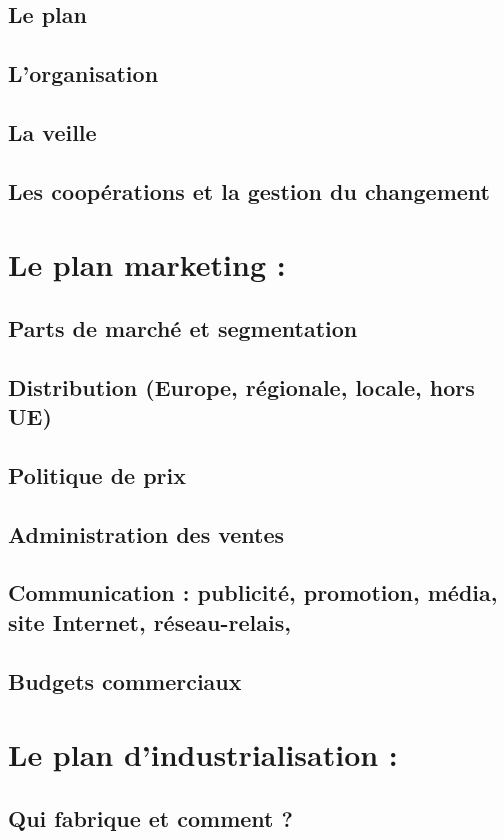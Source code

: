 	\subsection{Le plan}
	\subsection{L'organisation}
	\subsection{La veille}
	\subsection{Les coopérations et la gestion du changement}

\section{Le plan marketing :}
	\subsection{Parts de marché et segmentation}
	\subsection{Distribution (Europe, régionale, locale, hors UE)}
	\subsection{Politique de prix}
	\subsection{Administration des ventes}
	\subsection{Communication : publicité, promotion, média, site Internet, réseau-relais,}
	\subsection{Budgets commerciaux}

\section{Le plan d'industrialisation :}
	\subsection{Qui fabrique et comment ?}
